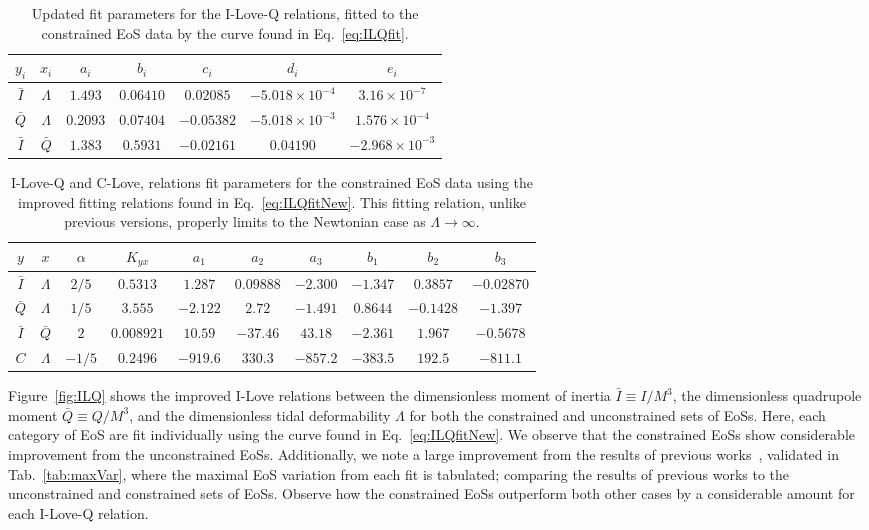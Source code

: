 \documentclass[prd,twocolumn,nofootinbib,superscriptaddress,amsmath,amssymb]{revtex4-1}
\begin{document}
\begin{table*}
\centering
\caption{
Updated fit parameters for the I-Love-Q relations, fitted to the constrained EoS data by the curve found in Eq.~\ref{eq:ILQfit}.
}\label{tab:ILQfit}
\begin{tabular}{ c  c | c c c c c } 
 \hline
 \hline
 $y_i$ & $x_i$ & $a_i$ & $b_i$ & $c_i$ & $d_i$ & $e_i$ \\
 \hline
 $\bar{I}$ & $\Lambda$ & $1.493$ & $0.06410$ & $0.02085$ & $-5.018 \times 10^{-4}$ & $3.16 \times 10^{-7}$ \\
 $\bar{Q}$ & $\Lambda$ & $0.2093$ & $0.07404$ & $-0.05382$ & $-5.018 \times 10^{-3}$ & $1.576 \times 10^{-4}$ \\ 
  $\bar{I}$ & $\bar{Q}$ & $1.383$ & $0.5931$ & $-0.02161$ & $0.04190$ & $-2.968 \times 10^{-3}$ \\
 \hline
 \hline
\end{tabular}
\end{table*}

\begin{table*}
\centering
\caption{
I-Love-Q and C-Love, relations fit parameters for the constrained EoS data using the improved fitting relations found in Eq.~\ref{eq:ILQfitNew}.
This fitting relation, unlike previous versions, properly limits to the Newtonian case as $\Lambda \rightarrow \infty$.
}\label{tab:ILQfitNew}
\begin{tabular}{ c  c  | c c c c c c c c} 
 \hline
 \hline
 $y$ & $x$ & $\alpha$ & $K_{yx}$ & $a_1$ & $a_2$ & $a_3$ & $b_1$ & $b_2$ & $b_3$ \\
 \hline
 $\bar{I}$ & $\Lambda$ & $2/5$ & $0.5313$ & $1.287$ & $0.09888$ & $-2.300$ & $-1.347$ & $0.3857$ & $-0.02870$\\
 $\bar{Q}$ & $\Lambda$ & $1/5$ & $3.555$ & $-2.122$ & $2.72$ & $-1.491$ & $0.8644$ & $-0.1428$ & $-1.397$\\
 $\bar{I}$ & $\bar{Q}$ & $2$ & $0.008921$ & $10.59$ & $-37.46$ & $43.18$ & $-2.361$ & $1.967$ & $-0.5678$\\
 $C$ & $\Lambda$ & $-1/5$ & $0.2496$ & $-919.6$ & $330.3$ & $-857.2$ & $-383.5$ & $192.5$ & $-811.1$\\
\hline
\hline
\end{tabular}
\end{table*}

Figure~\ref{fig:ILQ} shows the improved I-Love relations between the dimensionless moment of inertia $\bar{I} \equiv I/M^3$, the dimensionless quadrupole moment $\bar{Q} \equiv Q/M^3$, and the dimensionless tidal deformability $\Lambda$ for both the constrained and unconstrained sets of EoSs.
Here, each category of EoS are fit individually using the curve found in Eq.~\ref{eq:ILQfitNew}.
We observe that the constrained EoSs show considerable improvement from the unconstrained EoSs.
Additionally, we note a large improvement from the results of previous works~\cite{Yagi:ILQ}, validated in Tab.~\ref{tab:maxVar}, where the maximal EoS variation from each fit is tabulated; comparing the results of previous works to the unconstrained and constrained sets of EoSs.
Observe how the constrained EoSs outperform both other cases by a considerable amount for each I-Love-Q relation.
\end{document}
